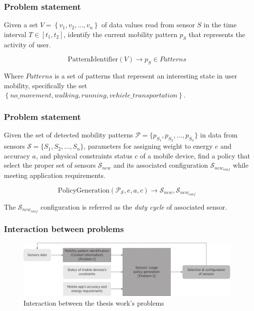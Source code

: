 \documentclass[compress,9pt,xcolor={dvipsnames,table}]{beamer}
\begin{document}
\begin{frame}\frametitle{Problem statement}
\begin{tcolorbox}[title=Problem statement: Mobility pattern identification,colframe=PineGreen]
\small
Given a set $V = \left\{v_{1}, v_{2}, \dotsc, v_{n}\right\}$ of data values read from sensor $S$ in the time interval $T  \in [t_{1}, t_{2}]$, identify the current mobility pattern $p_{S}$ that represents the activity of user.

\begin{equation}
  \text{PatternIdentifier}( V ) \longrightarrow{} p_{S} \in Patterns
\end{equation}

Where $Patterns$ is a set of patterns that represent an interesting state in user mobility, specifically the set $\left\{no\_movement, walking, running, vehicle\_transportation\right\}$.
\end{tcolorbox}
\end{frame}

\begin{frame}\frametitle{Problem statement}
\begin{tcolorbox}[title=Problem statement: Policy generation,colframe=PineGreen]
\small
Given the set of detected mobility patterns $\mathcal{P} = \{ p_{S_1}, p_{S_2}, \ldots, p_{S_n} \}$ in data from sensors $\mathcal{S} = \{ S_1,S_2,\ldots, S_n \}$, parameters for assigning weight to energy $e$ and accuracy $a$, and physical constraints status $c$ of a mobile device, find a policy that select the proper set of sensors $\mathcal{S}_{new}$ and its associated configuration $\mathcal{S}_{new_{conf}}$  while meeting application requirements.

\begin{equation}
  \text{PolicyGeneration}( \mathcal{P}_{\mathcal{S}}, e, a, c ) \longrightarrow{} \mathcal{S}_{new}, \mathcal{S}_{new_{conf}}
\end{equation}

The $\mathcal{S}_{new_{conf}}$ configuration is referred as the \emph{duty cycle} of associated sensor.
\end{tcolorbox}
\end{frame}

\begin{frame}\frametitle{Interaction between problems}
\begin{figure}[tb]
  \centering
  \includegraphics[width=\textwidth]{../../../resources/images/vectors/problems-incorporation}
  \caption{Interaction between the thesis work's problems}
  \label{fig:probems-incorporation}
\end{figure}
\end{frame}
\end{document}
